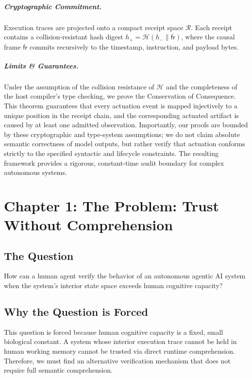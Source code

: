 \documentclass[11pt,oneside]{book}
\theoremstyle{definition}
\theoremstyle{plain}
\theoremstyle{remark}
\begin{document}
\paragraph{Cryptographic Commitment.}
Execution traces are projected onto a compact receipt space $\mathcal{R}$. %
Each receipt contains a collision-resistant hash digest $h_+ = \mathcal{H}(h_- \parallel \mathsf{fr})$, where the causal frame $\mathsf{fr}$ commits recursively to the timestamp, instruction, and payload bytes. %

\paragraph{Limits \& Guarantees.}
Under the assumption of the collision resistance of $\mathcal{H}$ and the completeness of the host compiler's type checking, we prove the Conservation of Consequence. %
This theorem guarantees that every actuation event is mapped injectively to a unique position in the receipt chain, and the corresponding actuated artifact is caused by at least one admitted observation. %
Importantly, our proofs are bounded by these cryptographic and type-system assumptions; we do not claim absolute semantic correctness of model outputs, but rather verify that actuation conforms strictly to the specified syntactic and lifecycle constraints. %
The resulting framework provides a rigorous, constant-time audit boundary for complex autonomous systems. %

\tableofcontents

\mainmatter

\chapter{Chapter 1: The Problem: Trust Without Comprehension}
\label{ch:problem}

\section{The Question}
How can a human agent verify the behavior of an autonomous agentic AI system when the system's interior state space exceeds human cognitive capacity? %

\section{Why the Question is Forced}
This question is forced because human cognitive capacity is a fixed, small biological constant. %
A system whose interior execution trace cannot be held in human working memory cannot be trusted via direct runtime comprehension. %
Therefore, we must find an alternative verification mechanism that does not require full semantic comprehension. %
\end{document}
